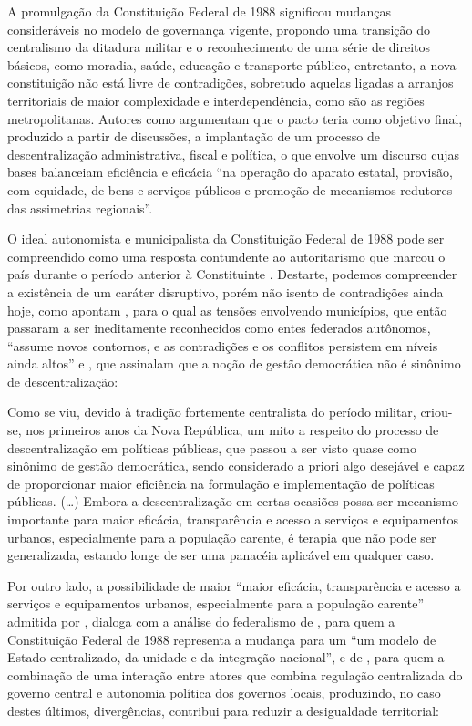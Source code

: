 \documentclass[
article,			%
11pt,				%
oneside,			%
a4paper,			%
english,			%
brazil,				%
sumario=tradicional
]{abntex2}
\begin{document}
	A promulgação da Constituição Federal de 1988 significou mudanças consideráveis no modelo de governança vigente, propondo uma transição do centralismo da ditadura militar e o reconhecimento de uma série de direitos básicos, como moradia, saúde, educação e transporte público, entretanto, a nova constituição não está livre de contradições, sobretudo aquelas ligadas a arranjos territoriais de maior complexidade e interdependência, como são as regiões metropolitanas. Autores como  argumentam que o pacto teria como objetivo final, produzido a partir de discussões, a implantação de um processo de descentralização administrativa, fiscal e política, o que envolve um discurso cujas bases balanceiam eficiência e eficácia ``na operação do aparato estatal, provisão, com equidade, de bens e serviços públicos e promoção de mecanismos redutores das assimetrias regionais''.
	
	O ideal autonomista e municipalista da Constituição Federal de 1988 pode ser compreendido como uma resposta contundente ao autoritarismo que marcou o país durante o período anterior à Constituinte \cite[p. 100]{guia2015a}. Destarte, podemos compreender a existência de um caráter disruptivo, porém não isento de contradições ainda hoje, como apontam , para o qual as tensões envolvendo municípios, que então passaram a ser ineditamente reconhecidos como entes federados autônomos, ``assume novos contornos, e as contradições e os conflitos persistem em níveis ainda altos'' e , que assinalam que a noção de gestão democrática não é sinônimo de descentralização:
	
	\begin{citacao}
		Como se viu, devido à tradição fortemente centralista do período militar, criou-se, nos primeiros anos da Nova República, um mito a respeito do processo de descentralização em políticas públicas, que passou a ser visto quase como sinônimo de gestão democrática, sendo considerado a priori algo desejável e capaz de proporcionar maior eficiência na formulação e implementação de políticas públicas. (\dots) Embora a descentralização em certas ocasiões possa ser mecanismo importante para maior eficácia, transparência e acesso a serviços e equipamentos urbanos, especialmente para a população carente, é terapia que não pode ser generalizada, estando longe de ser uma panacéia aplicável em qualquer caso.
	\end{citacao}
	
	Por outro lado, a possibilidade de maior ``maior eficácia, transparência e acesso a serviços e equipamentos urbanos, especialmente para a população carente'' admitida por , dialoga com a análise do federalismo de , para quem a Constituição Federal de 1988 representa a mudança para um ``um modelo de Estado centralizado, da unidade e da integração nacional'', e de , para quem a combinação de uma interação entre atores que combina regulação centralizada do governo central e autonomia política dos governos locais, produzindo, no caso destes últimos, divergências, contribui para reduzir a desigualdade territorial:
	
\end{document}
